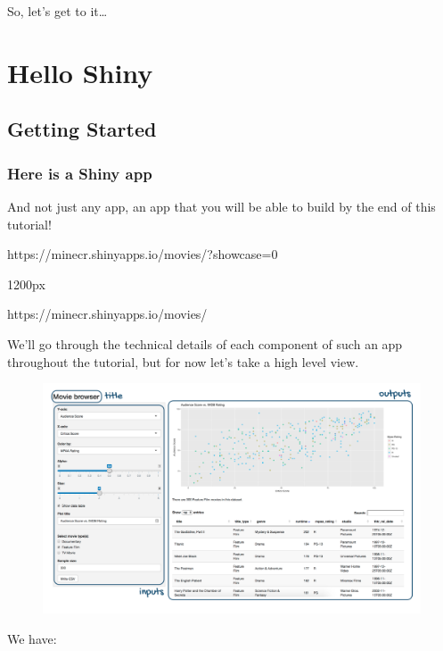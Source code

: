 \documentclass[
  letterpaper,
  DIV=11,
  numbers=noendperiod]{scrreprt}
\begin{document}
So, let's get to it\ldots{}

\part{Hello Shiny}

\hypertarget{getting-started}{%
\chapter{Getting Started}\label{getting-started}}

\hypertarget{here-is-a-shiny-app}{%
\section{Here is a Shiny app}\label{here-is-a-shiny-app}}

And not just any app, an app that you will be able to build by the end
of this tutorial!

https://minecr.shinyapps.io/movies/?showcase=0

1200px

https://minecr.shinyapps.io/movies/

We'll go through the technical details of each component of such an app
throughout the tutorial, but for now let's take a high level view.

\begin{figure}

{\centering \includegraphics[width=1\textwidth,height=\textheight]{./images/shiny-app-annotated.png}

}

\end{figure}

We have:
\end{document}
